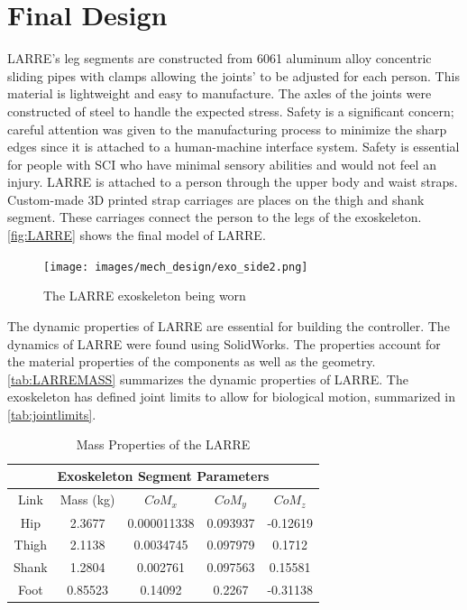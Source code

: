 \section{Final Design}

LARRE's leg segments are constructed from 6061 aluminum alloy concentric sliding pipes with clamps allowing the joints' to be adjusted for each person. This material is lightweight and easy to manufacture. The axles of the joints were constructed of steel to handle the expected stress. Safety is a significant concern; careful attention was given to the manufacturing process to minimize the sharp edges since it is attached to a human-machine interface system. Safety is essential for people with SCI who have minimal sensory abilities and would not feel an injury.  LARRE is attached to a person through the upper body and waist straps. Custom-made 3D printed strap carriages are places on the thigh and shank segment. These carriages connect the person to the legs of the exoskeleton. \autoref{fig:LARRE} shows the final model of LARRE.     


\begin{figure}
    \centering
    \texttt{[image: images/mech\_design/exo\_side2.png]}
    \caption{The LARRE exoskeleton being worn}
    \label{fig:LARRE}
\end{figure}


The dynamic properties of LARRE are essential for building the controller. The dynamics of LARRE were found using SolidWorks. The properties account for the material properties of the components as well as the geometry. \autoref{tab:LARREMASS} summarizes the dynamic properties of LARRE. The exoskeleton has defined joint limits to allow for biological motion, summarized in \autoref{tab:jointlimits}.

\begin{table}[h!]
    \centering
    \begin{tabular}{|c c c c c|}  
         \hline 
          \multicolumn{5}{|c|}{Exoskeleton Segment Parameters} \\
         \hline
         Link & Mass (kg) & $CoM_x$ & $CoM_y$ & $CoM_z$ \\
         \hline \hline
         Hip & 2.3677 & 0.000011338 & 0.093937 &  -0.12619 \\
         Thigh & 2.1138 & 0.0034745   & 0.097979 &  0.1712 \\
         Shank & 1.2804  &   0.002761 & 0.097563   & 0.15581\\
         Foot & 0.85523 & 0.14092 & 0.2267 &  -0.31138  \\
         \hline
    \end{tabular}    
    \caption[Dynamic Properties of the LARRE]{Mass Properties of the LARRE}
    \label{tab:LARREMASS}
\end{table}


